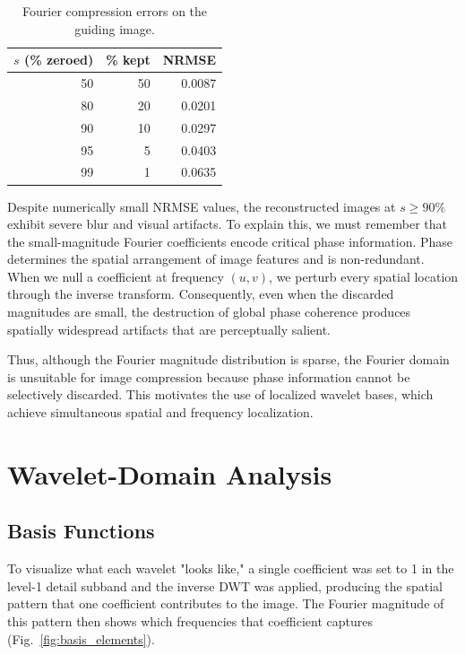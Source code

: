 \documentclass[10pt]{article}
\begin{document}
\begin{table}[h]
\centering
\caption{Fourier compression errors on the guiding image.}
\label{tab:fourier_error}
\begin{tabular}{rrr}
\toprule
$s$ (\% zeroed) & \% kept &  NRMSE \\
\midrule
50 & 50 &  0.0087 \\
80 & 20 &  0.0201 \\
90 & 10 &  0.0297 \\
95 & 5  &  0.0403 \\
99 & 1  &  0.0635 \\
\bottomrule
\end{tabular}
\end{table}

Despite numerically small NRMSE values, the reconstructed images at
$s \geq 90\%$ exhibit severe blur and visual artifacts. To explain this, we must remember that the small-magnitude Fourier coefficients encode
critical phase information.  Phase determines the spatial arrangement of
image features and is non-redundant. When we null a coefficient at frequency
$(u,v)$, we perturb every spatial location through the inverse transform.
Consequently, even when the discarded magnitudes are small, the destruction
of global phase coherence produces spatially widespread artifacts that are
perceptually salient.

Thus, although the Fourier magnitude distribution is sparse,
the Fourier domain is unsuitable for image compression because phase
information cannot be selectively discarded.  This motivates the use of
localized wavelet bases, which achieve simultaneous spatial and frequency
localization.


\section{Wavelet-Domain Analysis}
\label{sec:wavelet}

\subsection{Basis Functions}
To visualize what each wavelet "looks like," a single coefficient was set
to 1 in the level-1 detail subband and the inverse DWT was applied,
producing the spatial pattern that one coefficient contributes to the image.
The Fourier magnitude of this pattern then shows which frequencies that
coefficient captures (Fig.~\ref{fig:basis_elements}).
\end{document}
